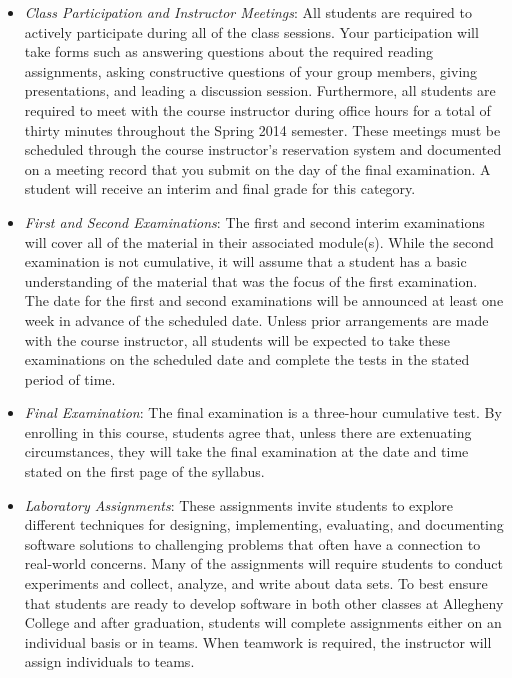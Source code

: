 \begin{itemize}

  \item {\em Class Participation and Instructor Meetings}: All students are required to actively participate
    during all of the class sessions. Your participation will take forms such as answering questions about the
    required reading assignments, asking constructive questions of your group members, giving presentations, and
    leading a discussion session. Furthermore, all students are required to meet with the course instructor during
    office hours for a total of thirty minutes throughout the Spring 2014 semester.  These meetings must be scheduled
    through the course instructor's reservation system and documented on a meeting record that you submit on the
    day of the final examination. A student will receive an interim and final grade for this category.

  \item {\em First and Second Examinations}: The first and second interim examinations will cover all of the material
    in their associated module(s).  While the second examination is not cumulative, it will assume that a student has a
    basic understanding of the material that was the focus of the first examination.  The date for the first and
    second examinations will be announced at least one week in advance of the scheduled date.  Unless prior
    arrangements are made with the course instructor, all students will be expected to take these examinations on the
    scheduled date and complete the tests in the stated period of time.

  \item {\em Final Examination}: The final examination is a three-hour cumulative test.  By enrolling in this
    course, students agree that, unless there are extenuating circumstances, they will take the final examination
    at the date and time stated on the first page of the syllabus.

  \item {\em Laboratory Assignments}: These assignments invite students to explore different techniques for
    designing, implementing, evaluating, and documenting software solutions to challenging problems that often
    have a connection to real-world concerns.  Many of the assignments will require students to conduct
    experiments and collect, analyze, and write about data sets.  To best ensure that students are ready to
    develop software in both other classes at Allegheny College and after graduation, students will complete
    assignments either on an individual basis or in teams.  When teamwork is required, the instructor will assign
    individuals to teams.


\end{itemize}
